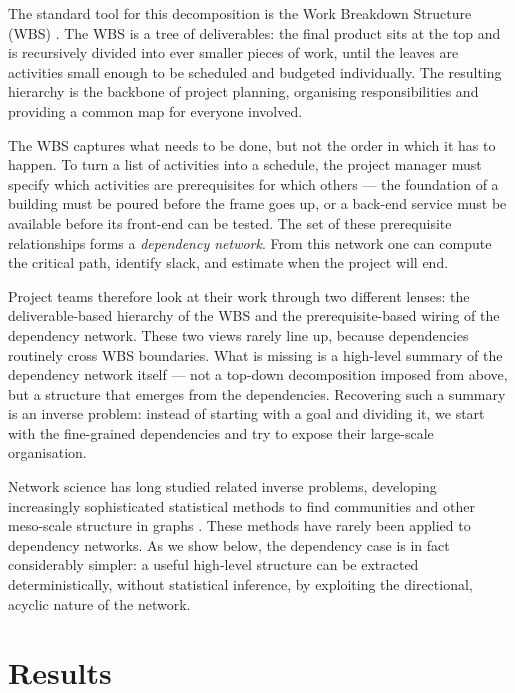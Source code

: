 \documentclass[11pt,a4paper]{article}
\begin{document}
The standard tool for this decomposition is the Work Breakdown Structure (WBS) \cite{pmi2021pmbok}. The WBS is a tree of deliverables: the final product sits at the top and is recursively divided into ever smaller pieces of work, until the leaves are activities small enough to be scheduled and budgeted individually. The resulting hierarchy is the backbone of project planning, organising responsibilities and providing a common map for everyone involved.

The WBS captures what needs to be done, but not the order in which it has to happen. To turn a list of activities into a schedule, the project manager must specify which activities are prerequisites for which others --- the foundation of a building must be poured before the frame goes up, or a back-end service must be available before its front-end can be tested. The set of these prerequisite relationships forms a {\em dependency network}. From this network one can compute the critical path, identify slack, and estimate when the project will end.

Project teams therefore look at their work through two different lenses: the deliverable-based hierarchy of the WBS and the prerequisite-based wiring of the dependency network. These two views rarely line up, because dependencies routinely cross WBS boundaries. What is missing is a high-level summary of the dependency network itself --- not a top-down decomposition imposed from above, but a structure that emerges from the dependencies. Recovering such a summary is an inverse problem: instead of starting with a goal and dividing it, we start with the fine-grained dependencies and try to expose their large-scale organisation.

Network science has long studied related inverse problems, developing increasingly sophisticated statistical methods to find communities and other meso-scale structure in graphs \cite{radicchi_communities_2004, newman_communities_2006, hofman_communities_2008, karrer_blockmodels_2011, peixoto2025}. These methods have rarely been applied to dependency networks. As we show below, the dependency case is in fact considerably simpler: a useful high-level structure can be extracted deterministically, without statistical inference, by exploiting the directional, acyclic nature of the network.

\section*{Results}
\end{document}
